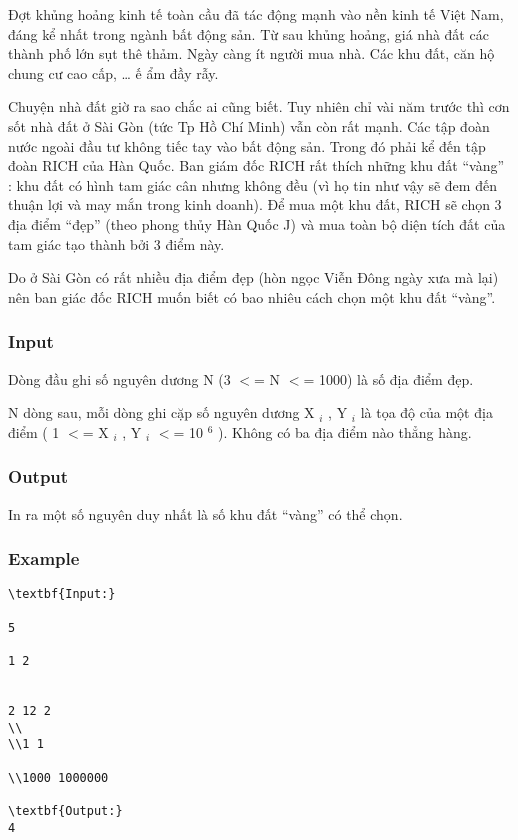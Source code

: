 



   Đợt khủng hoảng kinh tế toàn cầu đã tác động mạnh vào nền kinh tế Việt Nam, đáng kể nhất trong ngành bất động sản. Từ sau khủng hoảng, giá nhà đất các thành phố lớn sụt thê thảm. Ngày càng ít người mua nhà. Các khu đất, căn hộ chung cư cao cấp, … ế ẩm đầy rẫy.  

   Chuyện nhà đất giờ ra sao chắc ai cũng biết. Tuy nhiên chỉ vài năm trước thì cơn sốt nhà đất ở Sài Gòn (tức Tp Hồ Chí Minh) vẫn còn rất mạnh. Các tập đoàn nước ngoài đầu tư không tiếc tay vào bất động sản. Trong đó phải kể đến tập đoàn RICH của Hàn Quốc. Ban giám đốc RICH rất thích những khu đất “vàng” : khu đất có hình tam giác cân nhưng không đều (vì họ tin như vậy sẽ đem đến thuận lợi và may mắn trong kinh doanh). Để mua một khu đất, RICH sẽ chọn 3 địa điểm “đẹp” (theo phong thủy Hàn Quốc J) và mua toàn bộ diện tích đất của tam giác tạo thành bởi 3 điểm này.  

   Do ở Sài Gòn có rất nhiều địa điểm đẹp (hòn ngọc Viễn Đông ngày xưa mà lại) nên ban giác đốc RICH muốn biết có bao nhiêu cách chọn một khu đất “vàng”.  

\subsubsection{   Input  }

   Dòng đầu ghi số nguyên dương N (3 $<$= N $<$= 1000) là số địa điểm đẹp.  

   N dòng sau, mỗi dòng ghi cặp số nguyên dương X   $_    i   $   , Y   $_    i   $   là tọa độ của một địa điểm ( 1 $<$= X   $_    i   $   , Y   $_    i   $   $<$= 10   $^    6   $   ). Không có ba địa điểm nào thẳng hàng.  

\subsubsection{   Output  }

   In ra một số nguyên duy nhất là số khu đất “vàng” có thể chọn.  

\subsubsection{   Example  }
\begin{verbatim}
\textbf{Input:}

5

1 2


2 12 2
\\
\\1 1

\\1000 1000000

\textbf{Output:}
4
\end{verbatim}